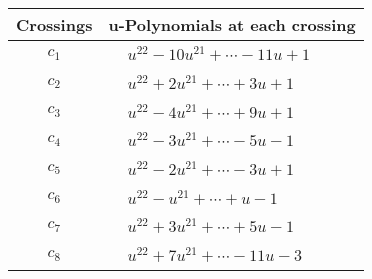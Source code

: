\documentclass[1p]{elsarticle_modified}
\theoremstyle{definition}
\begin{document}
\begin{tabular}{m{50pt}|m{274pt}}
Crossings & \hspace{64pt}u-Polynomials at each crossing \\
\hline $$\begin{aligned}c_{1}\end{aligned}$$&$\begin{aligned}
&u^{22}-10 u^{21}+\cdots-11 u+1
\end{aligned}$\\
\hline $$\begin{aligned}c_{2}\end{aligned}$$&$\begin{aligned}
&u^{22}+2 u^{21}+\cdots+3 u+1
\end{aligned}$\\
\hline $$\begin{aligned}c_{3}\end{aligned}$$&$\begin{aligned}
&u^{22}-4 u^{21}+\cdots+9 u+1
\end{aligned}$\\
\hline $$\begin{aligned}c_{4}\end{aligned}$$&$\begin{aligned}
&u^{22}-3 u^{21}+\cdots-5 u-1
\end{aligned}$\\
\hline $$\begin{aligned}c_{5}\end{aligned}$$&$\begin{aligned}
&u^{22}-2 u^{21}+\cdots-3 u+1
\end{aligned}$\\
\hline $$\begin{aligned}c_{6}\end{aligned}$$&$\begin{aligned}
&u^{22}- u^{21}+\cdots+u-1
\end{aligned}$\\
\hline $$\begin{aligned}c_{7}\end{aligned}$$&$\begin{aligned}
&u^{22}+3 u^{21}+\cdots+5 u-1
\end{aligned}$\\
\hline $$\begin{aligned}c_{8}\end{aligned}$$&$\begin{aligned}
&u^{22}+7 u^{21}+\cdots-11 u-3
\end{aligned}$\\

\end{tabular}
\end{document}

